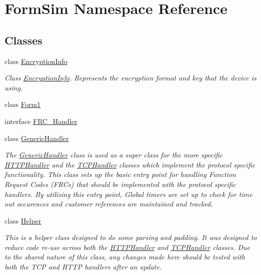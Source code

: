 \hypertarget{namespace_form_sim}{}\section{Form\+Sim Namespace Reference}
\label{namespace_form_sim}
\subsection*{Classes}
\begin{DoxyCompactItemize}
\item 
class \mbox{\hyperlink{class_form_sim_1_1_encryption_info}{Encryption\+Info}}
\begin{DoxyCompactList}\small\item\em Class \mbox{\hyperlink{class_form_sim_1_1_encryption_info}{Encryption\+Info}}. Represents the encryption format and key that the device is using. \end{DoxyCompactList}\item 
class \mbox{\hyperlink{class_form_sim_1_1_form1}{Form1}}
\item 
interface \mbox{\hyperlink{interface_form_sim_1_1_f_r_c___handler}{F\+R\+C\+\_\+\+Handler}}
\item 
class \mbox{\hyperlink{class_form_sim_1_1_generic_handler}{Generic\+Handler}}
\begin{DoxyCompactList}\small\item\em The \mbox{\hyperlink{class_form_sim_1_1_generic_handler}{Generic\+Handler}} class is used as a super class for the more specific \mbox{\hyperlink{class_form_sim_1_1_h_t_t_p_handler}{H\+T\+T\+P\+Handler}} and the \mbox{\hyperlink{class_form_sim_1_1_t_c_p_handler}{T\+C\+P\+Handler}} classes which implement the protocol specific functionality. This class sets up the basic entry point for handling Function Request Codes (F\+R\+Cs) that should be implemented with the protocol specific handlers. By utilizing this entry point, Global timers are set up to check for time out occurences and customer references are maintained and tracked. \end{DoxyCompactList}\item 
class \mbox{\hyperlink{class_form_sim_1_1_helper}{Helper}}
\begin{DoxyCompactList}\small\item\em This is a helper class designed to do some parsing and padding. It was designed to reduce code re-\/use across both the \mbox{\hyperlink{class_form_sim_1_1_h_t_t_p_handler}{H\+T\+T\+P\+Handler}} and \mbox{\hyperlink{class_form_sim_1_1_t_c_p_handler}{T\+C\+P\+Handler}} classes. Due to the shared nature of this class, any changes made here should be tested with both the T\+CP and H\+T\+TP handlers after an update. \end{DoxyCompactList}\item 

\end{DoxyCompactItemize}
